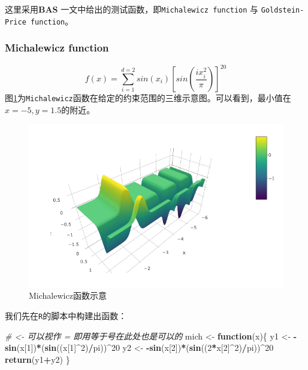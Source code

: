 \documentclass[]{ctexbook}
\newenvironment{Shaded}{\begin{snugshade}}{\end{snugshade}}
\newcommand{\KeywordTok}[1]{\textcolor[rgb]{0.13,0.29,0.53}{\textbf{#1}}}
\newcommand{\DecValTok}[1]{\textcolor[rgb]{0.00,0.00,0.81}{#1}}
\newcommand{\StringTok}[1]{\textcolor[rgb]{0.31,0.60,0.02}{#1}}
\newcommand{\CommentTok}[1]{\textcolor[rgb]{0.56,0.35,0.01}{\textit{#1}}}
\newcommand{\ControlFlowTok}[1]{\textcolor[rgb]{0.13,0.29,0.53}{\textbf{#1}}}
\newcommand{\OperatorTok}[1]{\textcolor[rgb]{0.81,0.36,0.00}{\textbf{#1}}}
\newcommand{\NormalTok}[1]{#1}
\begin{document}
这里采用\textbf{BAS}
\citep{Jiang2017BAS}一文中给出的测试函数，即\texttt{Michalewicz\ function}
与 \texttt{Goldstein-Price\ function}。

\subsubsection{Michalewicz function}\label{BASmich}

\[
f(x)=\sum_{i=1}^{d=2}sin(x_i)[sin(\frac{ix_i^2}{\pi})]^{20}
\]
图\ref{fig:mich}为\texttt{Michalewicz}函数在给定的约束范围的三维示意图。可以看到，最小值在\(x = -5,y = 1.5\)的附近。

\begin{figure}

{\centering \includegraphics[width=0.8\linewidth]{img/mich} 

}

\caption{ Michalewicz函数示意}\label{fig:mich}
\end{figure}

我们先在\texttt{R}的脚本中构建出函数：

\begin{Shaded}
\begin{Highlighting}[]
\CommentTok{# <- 可以视作 = 即用等于号在此处也是可以的 }
\NormalTok{mich <-}\StringTok{ }\ControlFlowTok{function}\NormalTok{(x)\{}
\NormalTok{  y1 <-}\StringTok{ }\OperatorTok{-}\KeywordTok{sin}\NormalTok{(x[}\DecValTok{1}\NormalTok{])}\OperatorTok{*}\NormalTok{(}\KeywordTok{sin}\NormalTok{((x[}\DecValTok{1}\NormalTok{]}\OperatorTok{^}\DecValTok{2}\NormalTok{)}\OperatorTok{/}\NormalTok{pi))}\OperatorTok{^}\DecValTok{20}
\NormalTok{  y2 <-}\StringTok{ }\OperatorTok{-}\KeywordTok{sin}\NormalTok{(x[}\DecValTok{2}\NormalTok{])}\OperatorTok{*}\NormalTok{(}\KeywordTok{sin}\NormalTok{((}\DecValTok{2}\OperatorTok{*}\NormalTok{x[}\DecValTok{2}\NormalTok{]}\OperatorTok{^}\DecValTok{2}\NormalTok{)}\OperatorTok{/}\NormalTok{pi))}\OperatorTok{^}\DecValTok{20}
  \KeywordTok{return}\NormalTok{(y1}\OperatorTok{+}\NormalTok{y2)}
\NormalTok{\}}
\end{Highlighting}
\end{Shaded}
\end{document}
